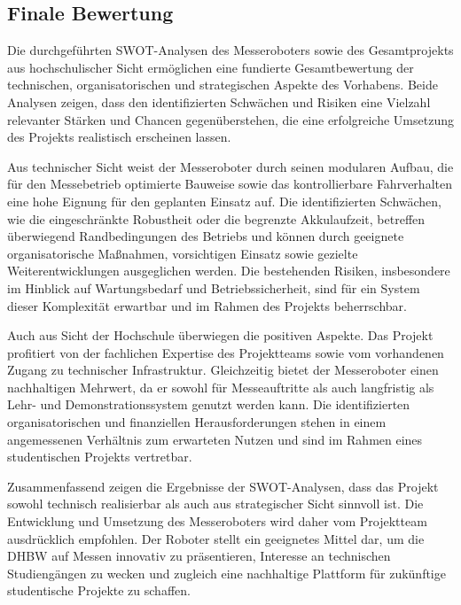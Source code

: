 \subsection{Finale Bewertung}
\label{cha:Finale Bewertung}

Die durchgeführten SWOT-Analysen des Messeroboters sowie des Gesamtprojekts aus hochschulischer Sicht ermöglichen eine fundierte Gesamtbewertung der technischen, organisatorischen und strategischen Aspekte des Vorhabens. Beide Analysen zeigen, dass den identifizierten Schwächen und Risiken eine Vielzahl relevanter Stärken und Chancen gegenüberstehen, die eine erfolgreiche Umsetzung des Projekts realistisch erscheinen lassen.

Aus technischer Sicht weist der Messeroboter durch seinen modularen Aufbau, die für den Messebetrieb optimierte Bauweise sowie das kontrollierbare Fahrverhalten eine hohe Eignung für den geplanten Einsatz auf. Die identifizierten Schwächen, wie die eingeschränkte Robustheit oder die begrenzte Akkulaufzeit, betreffen überwiegend Randbedingungen des Betriebs und können durch geeignete organisatorische Maßnahmen, vorsichtigen Einsatz sowie gezielte Weiterentwicklungen ausgeglichen werden. Die bestehenden Risiken, insbesondere im Hinblick auf Wartungsbedarf und Betriebssicherheit, sind für ein System dieser Komplexität erwartbar und im Rahmen des Projekts beherrschbar.

Auch aus Sicht der Hochschule überwiegen die positiven Aspekte. Das Projekt profitiert von der fachlichen Expertise des Projektteams sowie vom vorhandenen Zugang zu technischer Infrastruktur. Gleichzeitig bietet der Messeroboter einen nachhaltigen Mehrwert, da er sowohl für Messeauftritte als auch langfristig als Lehr- und Demonstrationssystem genutzt werden kann. Die identifizierten organisatorischen und finanziellen Herausforderungen stehen in einem angemessenen Verhältnis zum erwarteten Nutzen und sind im Rahmen eines studentischen Projekts vertretbar.

Zusammenfassend zeigen die Ergebnisse der SWOT-Analysen, dass das Projekt sowohl technisch realisierbar als auch aus strategischer Sicht sinnvoll ist. Die Entwicklung und Umsetzung des Messeroboters wird daher vom Projektteam ausdrücklich empfohlen. Der Roboter stellt ein geeignetes Mittel dar, um die DHBW auf Messen innovativ zu präsentieren, Interesse an technischen Studiengängen zu wecken und zugleich eine nachhaltige Plattform für zukünftige studentische Projekte zu schaffen.
